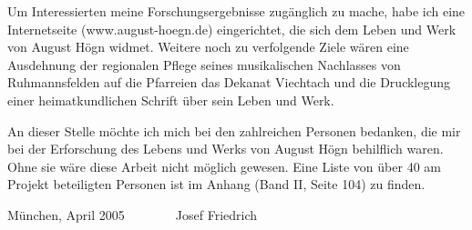 \documentclass[a4paper]{article}
\begin{document}
Um Interessierten meine Forschungsergebnisse zugänglich zu mache, habe
ich eine Internetseite (www.august-hoegn.de) eingerichtet, die sich dem
Leben und Werk von August Högn widmet. Weitere noch zu verfolgende
Ziele wären eine Ausdehnung der regionalen Pflege seines musikalischen
Nachlasses von Ruhmannsfelden auf die Pfarreien das Dekanat Viechtach
und die Drucklegung einer heimatkundlichen Schrift über sein Leben und
Werk.

An dieser Stelle möchte ich mich bei den zahlreichen Personen bedanken,
die mir bei der Erforschung des Lebens und Werks von August Högn
behilflich waren. Ohne sie wäre diese Arbeit nicht möglich gewesen.
Eine Liste von über 40 am Projekt beteiligten Personen ist im Anhang
(Band II, Seite 104) zu finden.

München, April 2005\ \ \ \ \ \ \ \ Josef Friedrich
\end{document}
